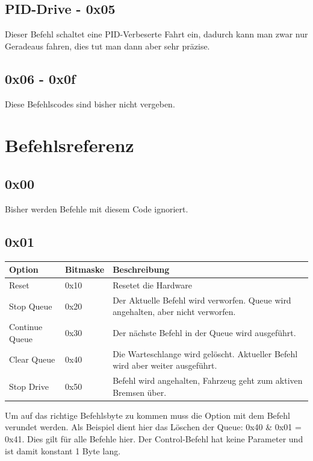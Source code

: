 \documentclass[a4paper]{article}
\begin{document}
	\subsection{PID-Drive - 0x05}

	Dieser Befehl schaltet eine PID-Verbeserte Fahrt ein, dadurch kann man zwar nur Geradeaus fahren, dies tut man dann aber
	sehr präzise.

	\subsection{0x06 - 0x0f}

	Diese Befehlscodes sind bisher nicht vergeben.


	\section{Befehlsreferenz}

	\subsection{0x00}

	Bisher werden Befehle mit diesem Code ignoriert.

	\subsection{0x01}

	\begin{tabularx}{\linewidth}{|l|l|X|}
		\hline
		\textbf{Option} & \textbf{Bitmaske} & \textbf{Beschreibung} \\
		\hline
		\hline
		Reset 			& 0x10 				& Resetet die Hardware \\
		\hline
		Stop Queue		& 0x20				& Der Aktuelle Befehl wird verworfen. Queue wird angehalten, aber nicht verworfen. \\
		\hline
		Continue Queue	& 0x30				& Der nächste Befehl in der Queue wird ausgeführt. \\
		\hline
		Clear Queue		& 0x40				& Die Warteschlange wird gelöscht. Aktueller Befehl wird aber weiter ausgeführt. \\
		\hline
		Stop Drive		& 0x50				& Befehl wird angehalten, Fahrzeug geht zum aktiven Bremsen über. \\
		\hline
	\end{tabularx}

	Um auf das richtige Befehlsbyte zu kommen muss die Option mit dem Befehl verundet werden. Als Beispiel dient hier das Löschen
	der Queue: 0x40 \& 0x01 = 0x41. Dies gilt für alle Befehle hier.
	Der Control-Befehl hat keine Parameter und ist damit konstant 1 Byte lang.
\end{document}

